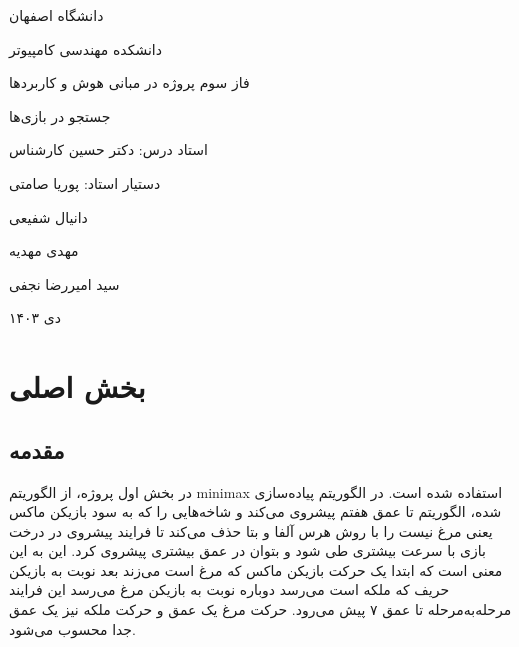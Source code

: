\documentclass[11pt, a4paper, oneside]{article}
\begin{document}
	
	\begin{titlepage}
		\centering
		\par
	
		\vspace{1cm}
    \par %
		
		\vspace{1mm}
		{\LARGE دانشگاه اصفهان}\par
		\vspace{1mm}
		{\Large دانشکده مهندسی کامپیوتر}\par
		
		\vspace{2cm}
		
		{\Large فاز سوم پروژه در مبانی هوش و کاربردها}\par
		\vspace{1cm}
		{\Huge جستجو در بازی‌ها}\par
		
		
		\vspace{2cm}
		{\Large استاد درس: دکتر حسین کارشناس}\par
		\vspace{0.5cm}
		{\Large دستیار استاد: پوریا صامتی}
		
		\vspace{1cm}
		{\Large دانیال شفیعی}\par
		{\Large مهدی مهدیه}\par
		{\Large سید امیررضا نجفی}\par
		
		\vspace{1.5cm}
		
		{\large دی ۱۴۰۳\par}
	\end{titlepage}
	\tableofcontents
	\newpage

	
		\section{بخش اصلی}
		
		
		
		
		
		\subsection{مقدمه}
در بخش اول پروژه، از الگوریتم minimax استفاده شده است. در الگوریتم پیاده‌سازی شده، الگوریتم تا عمق هفتم پیشروی می‌کند و شاخه‌هایی را که به سود بازیکن ماکس یعنی مرغ نیست را با روش هرس آلفا و بتا حذف می‌کند تا فرایند پیشروی در درخت بازی با سرعت بیشتری طی شود و بتوان در عمق بیشتری پیشروی کرد. این به این معنی است که ابتدا یک حرکت بازیکن ماکس که مرغ است می‌زند بعد نوبت به بازیکن حریف که ملکه است می‌رسد دوباره نوبت به بازیکن مرغ می‌رسد این فرایند مرحله‌به‌مرحله تا عمق ۷ پیش می‌رود. حرکت مرغ یک عمق و حرکت ملکه نیز یک عمق جدا محسوب می‌شود.
\end{document}
